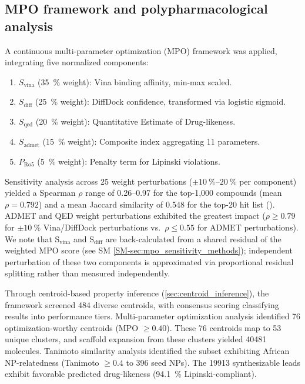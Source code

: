 \documentclass[journal=jcisd8,manuscript=article]{achemso}
\begin{document}
\subsection{MPO framework and polypharmacological analysis}
\label{sec:mpo-tiering}

A continuous multi-parameter optimization (MPO) framework was applied, integrating five normalized components:
\begin{enumerate}
    \item $S_{\text{vina}}$ (\qty{35}{\percent} weight): Vina binding affinity, min-max scaled.
    \item $S_{\text{diff}}$ (\qty{25}{\percent} weight): DiffDock confidence, transformed via logistic sigmoid.
    \item $S_{\text{qed}}$ (\qty{20}{\percent} weight): Quantitative Estimate of Drug-likeness.
    \item $S_{\text{admet}}$ (\qty{15}{\percent} weight): Composite index aggregating \num{11} parameters.
    \item $P_{\text{Ro5}}$ (\qty{5}{\percent} weight): Penalty term for Lipinski violations.
\end{enumerate}
Sensitivity analysis across \num{25} weight perturbations ($\pm \qtyrange{10}{20}{\percent}$ per component) yielded a Spearman $\rho$ range of \numrange{0.26}{0.97} for the top-1,000 compounds (mean $\rho = \num{0.792}$) and a mean Jaccard similarity of \num{0.548} for the top-20 hit list (). ADMET and QED weight perturbations exhibited the greatest impact ($\rho \geq \num{0.79}$ for $\pm\qty{10}{\percent}$ Vina/DiffDock perturbations vs.\ $\rho \leq \num{0.55}$ for ADMET perturbations). We note that S$_{\text{vina}}$ and S$_{\text{diff}}$ are back-calculated from a shared residual of the weighted MPO score (see SM \cref{SM-sec:mpo_sensitivity_methods}); independent perturbation of these two components is approximated via proportional residual splitting rather than measured independently.

Through centroid-based property inference (\cref{sec:centroid_inference}), the framework screened \num{484} diverse centroids, with consensus scoring classifying results into performance tiers. Multi-parameter optimization analysis identified \num{76} optimization-worthy centroids (MPO $\geq \num{0.40}$). These \num{76} centroids map to \num{53} unique clusters, and scaffold expansion from these clusters yielded \num{40481} molecules. Tanimoto similarity analysis identified the subset exhibiting African NP-relatedness (Tanimoto $\geq \num{0.4}$ to \num{396} seed NPs). The \num{19913} synthesizable leads exhibit favorable predicted drug-likeness (\qty{94.1}{\percent} Lipinski-compliant).
\end{document}
